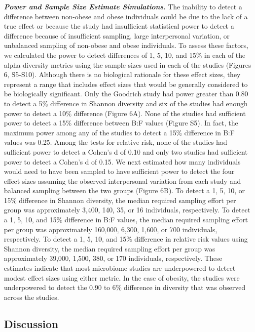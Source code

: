 \documentclass[12pt,]{article}
\begin{document}
\textbf{\emph{Power and Sample Size Estimate Simulations.}} The
inability to detect a difference between non-obese and obese individuals
could be due to the lack of a true effect or because the study had
insufficient statistical power to detect a difference because of
insufficient sampling, large interpersonal variation, or unbalanced
sampling of non-obese and obese individuals. To assess these factors, we
calculated the power to detect differences of 1, 5, 10, and 15\% in each
of the alpha diversity metrics using the sample sizes used in each of
the studies (Figures 6, S5-S10). Although there is no biological
rationale for these effect sizes, they represent a range that includes
effect sizes that would be generally considered to be biologically
significant. Only the Goodrich study had power greater than 0.80 to
detect a 5\% difference in Shannon diversity and six of the studies had
enough power to detect a 10\% difference (Figure 6A). None of the
studies had sufficient power to detect a 15\% difference between B:F
values (Figure S5). In fact, the maximum power among any of the studies
to detect a 15\% difference in B:F values was 0.25. Among the tests for
relative risk, none of the studies had sufficient power to detect a
Cohen's d of 0.10 and only two studies had sufficient power to detect a
Cohen's d of 0.15. We next estimated how many individuals would need to
have been sampled to have sufficient power to detect the four effect
sizes assuming the observed interpersonal variation from each study and
balanced sampling between the two groups (Figure 6B). To detect a 1, 5,
10, or 15\% difference in Shannon diversity, the median required
sampling effort per group was approximately 3,400, 140, 35, or 16
individuals, respectively. To detect a 1, 5, 10, and 15\% difference in
B:F values, the median required sampling effort per group was
approximately 160,000, 6,300, 1,600, or 700 individuals, respectively.
To detect a 1, 5, 10, and 15\% difference in relative risk values using
Shannon diversity, the median required sampling effort per group was
approximately 39,000, 1,500, 380, or 170 individuals, respectively.
These estimates indicate that most microbiome studies are underpowered
to detect modest effect sizes using either metric. In the case of
obesity, the studies were underpowered to detect the 0.90 to 6\%
difference in diversity that was observed across the studies.

\subsection{Discussion}\label{discussion}
\end{document}
